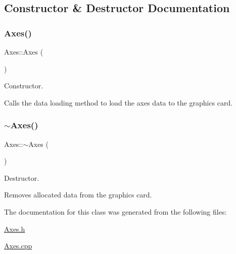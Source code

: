 \subsection{Constructor \& Destructor Documentation}
\mbox{\label{class_axes_a267a0b09346b4f3fb7ef92383f1f1d30}} 
\subsubsection{\texorpdfstring{Axes()}{Axes()}}
{\footnotesize\ttfamily Axes\+::\+Axes (\begin{DoxyParamCaption}{ }\end{DoxyParamCaption})}



Constructor. 

Calls the data loading method to load the axes data to the graphics card. \mbox{\label{class_axes_a2501d30bd3ac0031a22dbaa3fb377ed3}} 
\subsubsection{\texorpdfstring{$\sim$\+Axes()}{~Axes()}}
{\footnotesize\ttfamily Axes\+::$\sim$\+Axes (\begin{DoxyParamCaption}{ }\end{DoxyParamCaption})}



Destructor. 

Removes allocated data from the graphics card. 

The documentation for this class was generated from the following files\+:\begin{DoxyCompactItemize}
\item 
\hyperlink{_axes_8h}{Axes.\+h}\item 
\hyperlink{_axes_8cpp}{Axes.\+cpp}\end{DoxyCompactItemize}
